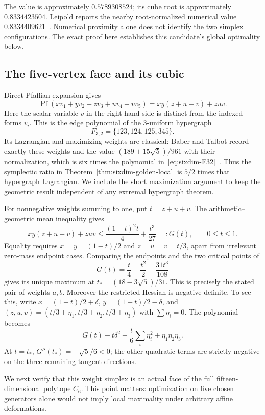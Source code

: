 The value is approximately $0.5789308524$; its cube root is approximately
$0.8334423504$. Leipold reports the nearby root-normalized numerical value
$0.8334409621$~\cite[Section~12.4 and Appendix]{Leipold2026}. Numerical
proximity alone does not identify the two simplex configurations. The
exact proof here establishes this candidate's global optimality below.

\subsection{The five-vertex face and its cubic}

Direct Pfaffian expansion gives
\begin{equation}\label{eq:sixdim-F32}
 \operatorname{Pf}(xv_1+yv_2+zv_3+uv_4+vv_5)
 =xy(z+u+v)+zuv.
\end{equation}
Here the scalar variable $v$ in the right-hand side is distinct from the
indexed forms $v_i$. This is the edge polynomial of the $3$-uniform
hypergraph
\[
 F_{3,2}=\{123,124,125,345\}.
\]
Its Lagrangian and maximizing weights are classical: Baber and Talbot
record exactly these weights and the value
$(189+15\sqrt5)/961$ with their normalization, which is six times the
polynomial in~\eqref{eq:sixdim-F32}~\cite[Theorem~22]{BaberTalbot2012}.
Thus the symplectic ratio in Theorem~\ref{thm:sixdim-golden-local} is
$5/2$ times that hypergraph Lagrangian. We include the short maximization
argument to keep the geometric result independent of any extremal
hypergraph theorem.

For nonnegative weights summing to one, put $t=z+u+v$. The arithmetic--
geometric mean inequality gives
\[
 xy(z+u+v)+zuv
 \le \frac{(1-t)^2t}{4}+\frac{t^3}{27}
 =:G(t),\qquad 0\le t\le1.
\]
Equality requires $x=y=(1-t)/2$ and $z=u=v=t/3$, apart from irrelevant
zero-mass endpoint cases. Comparing the endpoints and the two critical
points of
\[
 G(t)=\frac t4-\frac{t^2}{2}+\frac{31t^3}{108}
\]
gives its unique maximum at
$t_*=(18-3\sqrt5)/31$. This is precisely the stated pair of weights
$a,b$. Moreover the restricted Hessian is negative definite. To see this,
write $x=(1-t)/2+\delta$, $y=(1-t)/2-\delta$, and
$(z,u,v)=(t/3+\eta_1,t/3+\eta_2,t/3+\eta_3)$ with
$\sum\eta_i=0$. The polynomial becomes
\[
 G(t)-t\delta^2-\frac t6\sum_i\eta_i^2+\eta_1\eta_2\eta_3.
\]
At $t=t_*$, $G''(t_*)=-\sqrt5/6<0$; the other quadratic terms are
strictly negative on the three remaining tangent directions.

We next verify that this weight simplex is an actual face of the full
fifteen-dimensional polytope $C_6$. This point matters: optimization on
five chosen generators alone would not imply local maximality under
arbitrary affine deformations.

